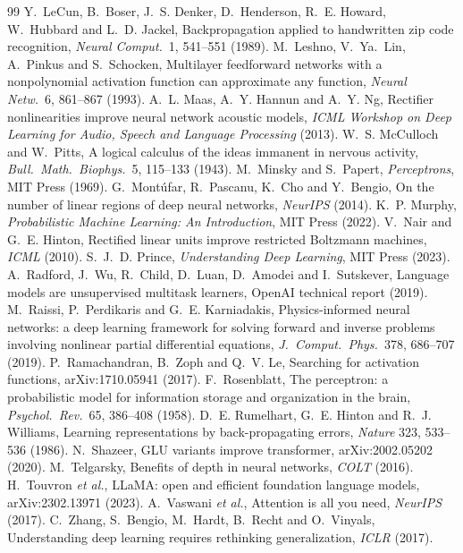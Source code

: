 \documentclass[11pt]{article}
\begin{document}
\begin{thebibliography}{99}
 Y.~LeCun, B.~Boser, J.~S. Denker, D.~Henderson, R.~E. Howard, W.~Hubbard and L.~D. Jackel, Backpropagation applied to handwritten zip code recognition, \emph{Neural Comput.}\ 1, 541--551 (1989).
 M.~Leshno, V.~Ya.~Lin, A.~Pinkus and S.~Schocken, Multilayer feedforward networks with a nonpolynomial activation function can approximate any function, \emph{Neural Netw.}\ 6, 861--867 (1993).
 A.~L. Maas, A.~Y. Hannun and A.~Y. Ng, Rectifier nonlinearities improve neural network acoustic models, \emph{ICML Workshop on Deep Learning for Audio, Speech and Language Processing} (2013).
 W.~S. McCulloch and W.~Pitts, A logical calculus of the ideas immanent in nervous activity, \emph{Bull.\ Math.\ Biophys.}\ 5, 115--133 (1943).
 M.~Minsky and S.~Papert, \emph{Perceptrons}, MIT Press (1969).
 G.~Mont\'ufar, R.~Pascanu, K.~Cho and Y.~Bengio, On the number of linear regions of deep neural networks, \emph{NeurIPS} (2014).
 K.~P. Murphy, \emph{Probabilistic Machine Learning: An Introduction}, MIT Press (2022).
 V.~Nair and G.~E. Hinton, Rectified linear units improve restricted Boltzmann machines, \emph{ICML} (2010).
 S.~J.~D. Prince, \emph{Understanding Deep Learning}, MIT Press (2023).
 A.~Radford, J.~Wu, R.~Child, D.~Luan, D.~Amodei and I.~Sutskever, Language models are unsupervised multitask learners, OpenAI technical report (2019).
 M.~Raissi, P.~Perdikaris and G.~E. Karniadakis, Physics-informed neural networks: a deep learning framework for solving forward and inverse problems involving nonlinear partial differential equations, \emph{J.\ Comput.\ Phys.}\ 378, 686--707 (2019).
 P.~Ramachandran, B.~Zoph and Q.~V. Le, Searching for activation functions, arXiv:1710.05941 (2017).
 F.~Rosenblatt, The perceptron: a probabilistic model for information storage and organization in the brain, \emph{Psychol.\ Rev.}\ 65, 386--408 (1958).
 D.~E. Rumelhart, G.~E. Hinton and R.~J. Williams, Learning representations by back-propagating errors, \emph{Nature} 323, 533--536 (1986).
 N.~Shazeer, GLU variants improve transformer, arXiv:2002.05202 (2020).
 M.~Telgarsky, Benefits of depth in neural networks, \emph{COLT} (2016).
 H.~Touvron \emph{et al.}, LLaMA: open and efficient foundation language models, arXiv:2302.13971 (2023).
 A.~Vaswani \emph{et al.}, Attention is all you need, \emph{NeurIPS} (2017).
 C.~Zhang, S.~Bengio, M.~Hardt, B.~Recht and O.~Vinyals, Understanding deep learning requires rethinking generalization, \emph{ICLR} (2017).
\end{thebibliography}

\SourceNote
\end{document}
